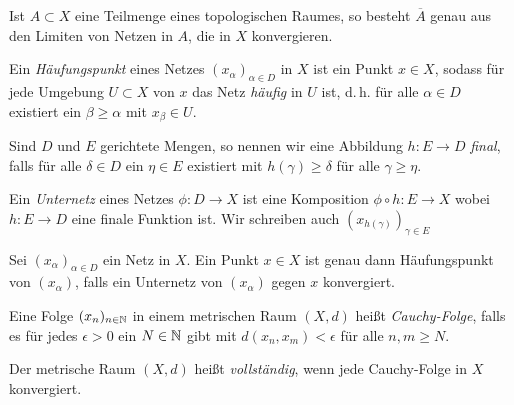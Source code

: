 \documentclass{cheat-sheet}
\begin{document}
\begin{prop}
  Ist $A \subset X$ eine Teilmenge eines topologischen Raumes, so besteht $\overline{A}$ genau aus den Limiten von Netzen in $A$, die in $X$ konvergieren.
\end{prop}

\begin{defn}
  Ein \emph{Häufungspunkt} eines Netzes $(x_\alpha)_{\alpha \in D}$ in $X$ ist ein Punkt $x \in X$, sodass für jede Umgebung $U \subset X$ von $x$ das Netz \emph{häufig} in $U$ ist, d.\,h. für alle $\alpha \in D$ existiert ein $\beta \geq \alpha$ mit $x_\beta \in U$.
\end{defn}

\begin{defn}
  Sind $D$ und $E$ gerichtete Mengen, so nennen wir eine Abbildung $h : E \to D$ \emph{final}, falls für alle $\delta \in D$ ein $\eta \in E$ existiert mit $h(\gamma) \geq \delta$ für alle $\gamma \geq \eta$.
\end{defn}

\begin{defn}
  Ein \emph{Unternetz} eines Netzes $\phi : D \to X$ ist eine Komposition $\phi \circ h : E \to X$ wobei $h : E \to D$ eine finale Funktion ist. Wir schreiben auch $(x_{h(\gamma)})_{\gamma \in E}$
\end{defn}


\begin{prop}
  Sei $(x_\alpha)_{\alpha \in D}$ ein Netz in $X$. Ein Punkt $x \in X$ ist genau dann Häufungspunkt von $(x_\alpha)$, falls ein Unternetz von $(x_\alpha)$ gegen $x$ konvergiert.
\end{prop}

\begin{defn}
  Eine Folge $(x_n)_{n \in \mathbb{N}}$ in einem metrischen Raum $(X, d)$ heißt \emph{Cauchy-Folge}, falls es für jedes $\epsilon > 0$ ein $N \in \mathbb{N}$ gibt mit $d(x_n, x_m) < \epsilon$ für alle $n, m \geq N$.
\end{defn}

\begin{defn}
  Der metrische Raum $(X, d)$ heißt \emph{vollständig}, wenn jede Cauchy-Folge in $X$ konvergiert.
\end{defn}

\end{document}
